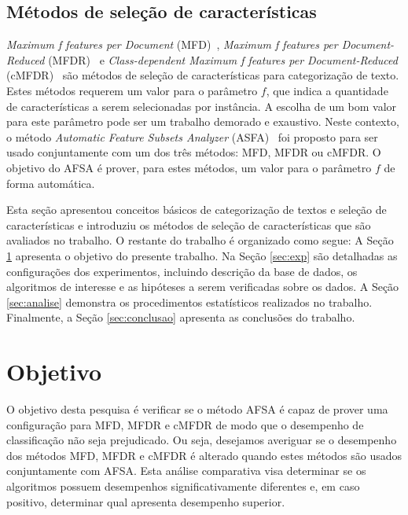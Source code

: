 \documentclass[conference]{IEEEtran}
\begin{document}
\subsection{Métodos de seleção de características}
\label{sec:metodos}

\textit{Maximum f features per Document} (MFD)~\cite{mfd2014}, \textit{Maximum f features per Document-Reduced} (MFDR)~\cite{mfd2014} e \textit{Class-dependent Maximum f features per Document-Reduced} (cMFDR)~\cite{fragoso2016cmfdr} são métodos de seleção de características para categorização de texto.
Estes métodos requerem um valor para o parâmetro $f$, que indica a quantidade de características a serem selecionadas por instância.
A escolha de um bom valor para este parâmetro pode ser um trabalho demorado e exaustivo.
Neste contexto, o método \textit{Automatic Feature Subsets Analyzer} (ASFA)~\cite{fragoso2016afsa} foi proposto para ser usado conjuntamente com um dos três métodos: MFD, MFDR ou cMFDR.
O objetivo do AFSA é prover, para estes métodos, um valor para o parâmetro $f$ de forma automática.

Esta seção apresentou conceitos básicos de categorização de textos e seleção de características e introduziu os métodos de seleção de características que são avaliados no trabalho. 
O restante do trabalho é organizado como segue: 
A Seção \ref{sec:objetivo} apresenta o objetivo do presente trabalho. 
Na Seção \ref{sec:exp} são detalhadas as configurações dos experimentos, incluindo descrição da base de dados, os algoritmos de interesse e as hipóteses a serem verificadas sobre os dados. 
A Seção \ref{sec:analise} demonstra os procedimentos estatísticos realizados no trabalho.
Finalmente, a Seção \ref{sec:conclusao} apresenta as conclusões do trabalho.

\section{Objetivo}
\label{sec:objetivo}

O objetivo desta pesquisa é verificar se o método AFSA é capaz de prover uma configuração para MFD, MFDR e cMFDR de modo que o desempenho de classificação não seja prejudicado. Ou seja, desejamos averiguar se o desempenho dos métodos MFD, MFDR e cMFDR é alterado quando estes métodos são usados conjuntamente com AFSA.
Esta análise comparativa visa determinar se os algoritmos possuem desempenhos significativamente diferentes e, em caso positivo, determinar qual apresenta desempenho superior.
\end{document}
